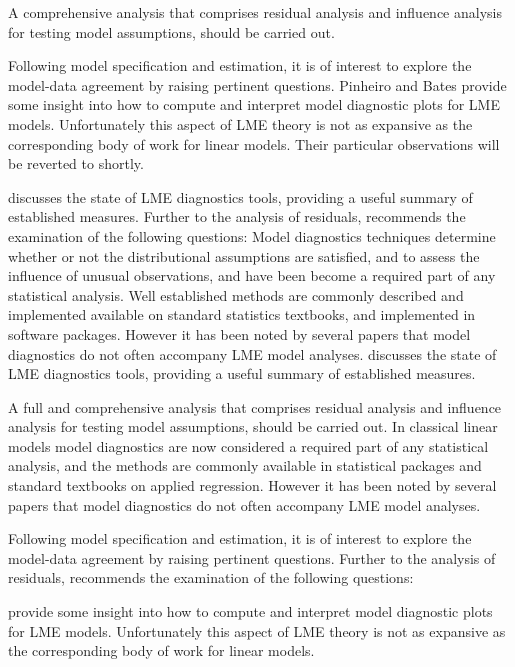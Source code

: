 \documentclass[]{report}
\begin{document}
A comprehensive analysis that comprises residual analysis and influence analysis for testing model assumptions, should be carried out. 
	
	Following model specification and estimation, it is of interest to explore the model-data
	agreement by raising pertinent questions. Pinheiro and Bates provide some insight into how to compute and interpret model diagnostic plots for LME models. Unfortunately this aspect of LME theory is not as expansive as the corresponding body of work for linear models. Their particular observations will be reverted to shortly. 
	
\citet{schabenberger} discusses the state of LME diagnostics tools, providing a useful summary of established measures. Further to the analysis of residuals, \citet{schabenberger} recommends the examination of the following questions:
\newpage
Model diagnostics techniques determine whether or not the distributional assumptions are satisfied, and to assess the influence of unusual observations, and have been become a required part of any statistical analysis. Well established methods are commonly described and implemented available on standard statistics textbooks, and implemented in software packages. However it has been noted by several papers that model diagnostics do not often accompany LME model analyses. \citet{schabenberger} discusses the state of LME diagnostics tools, providing a useful summary of established measures.
	
	A full and comprehensive
	analysis that comprises residual analysis and influence analysis for testing model assumptions, should be carried out.  In classical linear models model diagnostics are now considered a required part of any statistical analysis, and the methods are commonly available in statistical packages and standard textbooks on applied regression. However it has been noted by several papers \citep{Christensen, schabenberger} that model diagnostics do not often accompany LME model analyses.
	
Following model specification and estimation, it is of interest to explore the model-data agreement by raising pertinent questions.  Further to the analysis of residuals, \citet{schabenberger} recommends the examination of the following questions:

\citet{PB} provide some insight into how to compute and interpret model diagnostic plots for LME models. Unfortunately this aspect of LME theory is not as expansive as the corresponding body of work for linear models.
\end{document}

